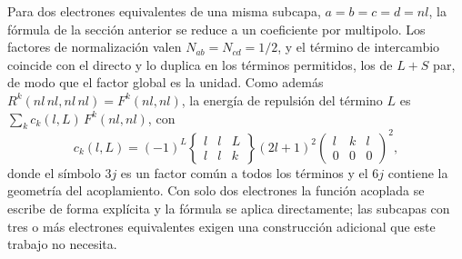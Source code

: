 Para dos electrones equivalentes de una misma subcapa, $a = b = c = d = nl$, la fórmula de la sección anterior se reduce a un coeficiente por multipolo. Los factores de normalización valen $N_{ab} = N_{cd} = 1/2$, y el término de intercambio coincide con el directo y lo duplica en los términos permitidos, los de $L+S$ par, de modo que el factor global es la unidad. Como además $R^k(nl\,nl, nl\,nl) = F^k(nl,nl)$, la energía de repulsión del término $L$ es $\sum_k c_k(l,L)\,F^k(nl,nl)$, con
\begin{equation}
    \label{eq:fk_general}
    c_k(l, L) = (-1)^L \begin{Bmatrix} l & l & L \\ l & l & k \end{Bmatrix} (2l+1)^2 \begin{pmatrix} l & k & l \\ 0 & 0 & 0 \end{pmatrix}^2 ,
\end{equation}
donde el símbolo $3j$ es un factor común a todos los términos y el $6j$ contiene la geometría del acoplamiento. Con solo dos electrones la función acoplada se escribe de forma explícita y la fórmula se aplica directamente; las subcapas con tres o más electrones equivalentes exigen una construcción adicional \parencite[Sección 9-5]{Cowan1981} que este trabajo no necesita.

